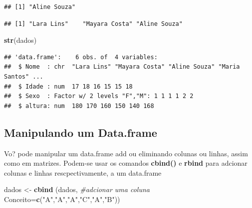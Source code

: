 \documentclass[]{book}
\newenvironment{Shaded}{\begin{snugshade}}{\end{snugshade}}
\newcommand{\CommentTok}[1]{\textcolor[rgb]{0.56,0.35,0.01}{\textit{#1}}}
\newcommand{\DataTypeTok}[1]{\textcolor[rgb]{0.13,0.29,0.53}{#1}}
\newcommand{\DecValTok}[1]{\textcolor[rgb]{0.00,0.00,0.81}{#1}}
\newcommand{\KeywordTok}[1]{\textcolor[rgb]{0.13,0.29,0.53}{\textbf{#1}}}
\newcommand{\NormalTok}[1]{#1}
\newcommand{\OperatorTok}[1]{\textcolor[rgb]{0.81,0.36,0.00}{\textbf{#1}}}
\newcommand{\StringTok}[1]{\textcolor[rgb]{0.31,0.60,0.02}{#1}}
\begin{document}
\begin{verbatim}
## [1] "Aline Souza"
\end{verbatim}

\begin{Shaded}
\end{Shaded}

\begin{verbatim}
## [1] "Lara Lins"    "Mayara Costa" "Aline Souza"
\end{verbatim}

\begin{Shaded}
\begin{Highlighting}[]
\KeywordTok{str}\NormalTok{(dados)}
\end{Highlighting}
\end{Shaded}

\begin{verbatim}
## 'data.frame':    6 obs. of  4 variables:
##  $ Nome  : chr  "Lara Lins" "Mayara Costa" "Aline Souza" "Maria Santos" ...
##  $ Idade : num  17 18 16 15 15 18
##  $ Sexo  : Factor w/ 2 levels "F","M": 1 1 1 1 2 2
##  $ altura: num  180 170 160 150 140 168
\end{verbatim}

\hypertarget{manipulando-um-data.frame}{%
\subsection{Manipulando um Data.frame}\label{manipulando-um-data.frame}}

Vo? pode manipular um data.frame add ou eliminando colunas ou linhas, assim como em matrizes. Podem-se usar os comandos \textbf{cbind()} e \textbf{rbind} para adcionar colunas e linhas rescpectivamente, a um data.frame

\begin{Shaded}
\begin{Highlighting}[]
\NormalTok{dados <-}\StringTok{ }\KeywordTok{cbind}\NormalTok{ (dados, }\CommentTok{#adcionar uma coluna}
               \DataTypeTok{Conceito=}\KeywordTok{c}\NormalTok{(}\StringTok{"A"}\NormalTok{,}\StringTok{"A"}\NormalTok{,}\StringTok{"A"}\NormalTok{,}\StringTok{"C"}\NormalTok{,}\StringTok{"A"}\NormalTok{,}\StringTok{"B"}\NormalTok{))}
\end{Highlighting}
\end{Shaded}
\end{document}
